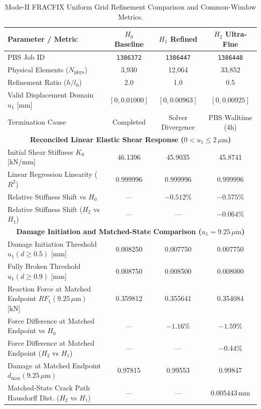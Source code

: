 \begin{table}[htbp]
\centering
\caption{Mode-II FRACFIX Uniform Grid Refinement Comparison and Common-Window Metrics.}
\label{tab:mode_ii_fracfix_convergence}
\begin{tabular}{lccc}
\hline
\textbf{Parameter / Metric} & \textbf{$H_0$ Baseline} & \textbf{$H_1$ Refined} & \textbf{$H_2$ Ultra-Fine} \\
\hline
PBS Job ID & \texttt{1386372} & \texttt{1386447} & \texttt{1386448} \\
Physical Elements ($N_{\text{phys}}$) & 3,930 & 12,064 & 33,852 \\
Refinement Ratio ($h/l_0$) & 2.0 & 1.0 & 0.5 \\
Valid Displacement Domain $u_1$ [mm] & $[0, 0.01000]$ & $[0, 0.00963]$ & $[0, 0.00925]$ \\
Termination Cause & Completed & Solver Divergence & PBS Walltime (4h) \\
\hline
\multicolumn{4}{c}{\textbf{Reconciled Linear Elastic Shear Response ($0 < u_1 \le 2\,\mu\text{m}$)}} \\
Initial Shear Stiffness $K_0$ [kN/mm] & 46.1396 & 45.9035 & 45.8741 \\
Linear Regression Linearity ($R^2$) & 0.999996 & 0.999996 & 0.999996 \\
Relative Stiffness Shift vs $H_0$ & --- & $-0.512\%$ & $-0.575\%$ \\
Relative Stiffness Shift ($H_2$ vs $H_1$) & --- & --- & $\mathbf{-0.064\%}$ \\
\hline
\multicolumn{4}{c}{\textbf{Damage Initiation and Matched-State Comparison ($u_1 = 9.25\,\mu\text{m}$)}} \\
Damage Initiation Threshold $u_1(d \ge 0.5)$ [mm] & 0.008250 & 0.007750 & 0.007750 \\
Fully Broken Threshold $u_1(d \ge 0.9)$ [mm] & 0.008750 & 0.008500 & 0.008000 \\
Reaction Force at Matched Endpoint $RF_1(9.25\,\mu\text{m})$ [kN] & 0.359812 & 0.355641 & 0.354084 \\
Force Difference at Matched Endpoint vs $H_0$ & --- & $-1.16\%$ & $-1.59\%$ \\
Force Difference at Matched Endpoint ($H_2$ vs $H_1$) & --- & --- & $\mathbf{-0.44\%}$ \\
Damage at Matched Endpoint $d_{\max}(9.25\,\mu\text{m})$ & 0.97815 & 0.99553 & 0.99847 \\
Matched-State Crack Path Hausdorff Dist. ($H_2$ vs $H_1$) & --- & --- & $0.005443\,\text{mm}$ \\

\end{tabular}
\end{table}
